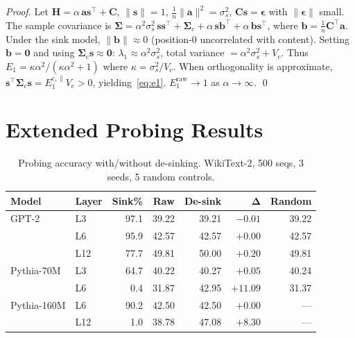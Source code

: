 \documentclass[11pt]{article}
\begin{document}
\begin{proof}
Let $\mathbf{H} = \alpha\,\mathbf{a}\mathbf{s}^\top + \mathbf{C}$, $\|\mathbf{s}\| = 1$, $\frac{1}{n}\|\mathbf{a}\|^2 = \sigma_s^2$, $\mathbf{C}\mathbf{s} = \boldsymbol{\epsilon}$ with $\|\boldsymbol{\epsilon}\|$ small.
The sample covariance is
$\boldsymbol{\Sigma} = \alpha^2\sigma_s^2\,\mathbf{s}\mathbf{s}^\top + \boldsymbol{\Sigma}_c + \alpha\,\mathbf{s}\mathbf{b}^\top + \alpha\,\mathbf{b}\mathbf{s}^\top$,
where $\mathbf{b} = \frac{1}{n}\mathbf{C}^\top\mathbf{a}$.
Under the sink model, $\|\mathbf{b}\| \approx 0$ (position-0 uncorrelated with content).
Setting $\mathbf{b} = \mathbf{0}$ and using $\boldsymbol{\Sigma}_c\mathbf{s} \approx \mathbf{0}$:
$\lambda_1 \approx \alpha^2\sigma_s^2$, total variance $= \alpha^2\sigma_s^2 + V_c$.
Thus $E_1 = \kappa\alpha^2/(\kappa\alpha^2 + 1)$ where $\kappa = \sigma_s^2/V_c$.
When orthogonality is approximate, $\mathbf{s}^\top\boldsymbol{\Sigma}_c\mathbf{s} = E_1^{c,\parallel}V_c > 0$, yielding~\eqref{eq:e1}.
$E_1^{\text{raw}} \to 1$ as $\alpha \to \infty$. \qed
\end{proof}

\section{Extended Probing Results}\label{app:probing}

\begin{table}[h]
\centering
\caption{Probing accuracy with/without de-sinking. WikiText-2, 500 seqs, 3 seeds, 5 random controls.}
\small
\begin{tabular}{@{}llrrrrr@{}}
\toprule
\textbf{Model} & \textbf{Layer} & \textbf{Sink\%} & \textbf{Raw} & \textbf{De-sink} & $\boldsymbol{\Delta}$ & \textbf{Random} \\
\midrule
GPT-2 & L3 & 97.1 & 39.22 & 39.21 & $-0.01$ & 39.22 \\
 & L6 & 95.9 & 42.57 & 42.57 & $+0.00$ & 42.57 \\
 & L12 & 77.7 & 49.81 & 50.00 & $+0.20$ & 49.81 \\
\midrule
Pythia-70M & L3 & 64.7 & 40.22 & 40.27 & $+0.05$ & 40.24 \\
 & L6 & 0.4 & 31.87 & 42.95 & $\mathbf{+11.09}$ & 31.37 \\
\midrule
Pythia-160M & L6 & 90.2 & 42.50 & 42.50 & $+0.00$ & --- \\
 & L12 & 1.0 & 38.78 & 47.08 & $\mathbf{+8.30}$ & --- \\
\bottomrule
\end{tabular}
\end{table}
\end{document}

